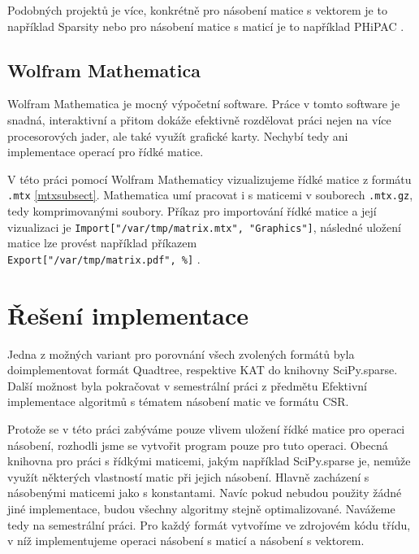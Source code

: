 Podobných projektů je více, konkrétně pro násobení matice s vektorem je to například Sparsity \cite{sparsity} nebo pro násobení matice s maticí je to například PHiPAC \cite{PHiPAC}\cite{bilmes96a}.

\subsection{Wolfram Mathematica}

Wolfram Mathematica \cite{mathematica} je mocný výpočetní software. Práce v tomto software je snadná, interaktivní a přitom dokáže efektivně rozdělovat práci nejen na více procesorových jader, ale také využít grafické karty. Nechybí tedy ani implementace operací pro řídké matice.

V této práci pomocí Wolfram Mathematicy vizualizujeme řídké matice z formátu \texttt{.mtx} \ref{mtxsubsect}. Mathematica umí pracovat i s maticemi v souborech \texttt{.mtx.gz}, tedy komprimovanými soubory. Příkaz pro importování řídké matice a její vizualizaci je \texttt{Import["/var/tmp/matrix.mtx", "Graphics"]}, následné uložení matice lze provést například příkazem \\ \texttt{Export["/var/tmp/matrix.pdf", \%]} \cite{mathematicaMTX}.

\section{Řešení implementace}

Jedna z možných variant pro porovnání všech zvolených formátů byla doimplementovat formát Quadtree, respektive KAT do knihovny SciPy.sparse. Další možnost byla pokračovat v semestrální práci z předmětu Efektivní implementace algoritmů s tématem násobení matic ve formátu CSR.

Protože se v této práci zabýváme pouze vlivem uložení řídké matice pro operaci násobení, rozhodli jsme se vytvořit program pouze pro tuto operaci. Obecná knihovna pro práci s řídkými maticemi, jakým například SciPy.sparse je, nemůže využít některých vlastností matic při jejich násobení. Hlavně zacházení s násobenými maticemi jako s konstantami. Navíc pokud nebudou použity žádné jiné implementace, budou všechny algoritmy stejně optimalizované. Navážeme tedy na semestrální práci. Pro každý formát vytvoříme ve zdrojovém kódu třídu, v níž implementujeme operaci násobení s maticí a násobení s vektorem.
